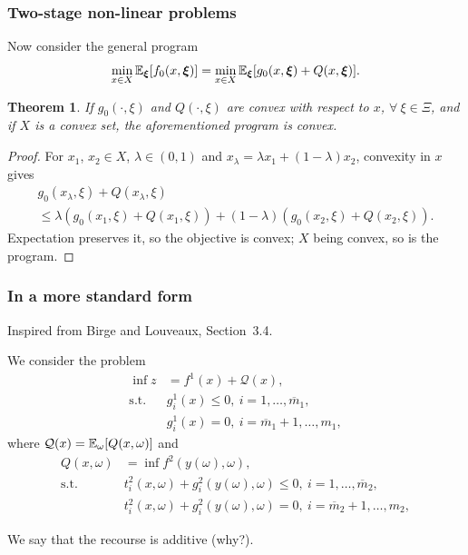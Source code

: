 \documentclass[aspectratio=169]{beamer}
\newtheorem{theo}{Theorem}
\begin{document}
\begin{frame}
\frametitle{Two-stage non-linear problems}
\small

Now consider the general program
\[
\min_{x \in X} {\mathbb{E}}_{{\boldsymbol{\xi}}} [ f_0(x, {\boldsymbol{\xi}}) ] = \min_{x \in X}
{\mathbb{E}}_{{\boldsymbol{\xi}}} [g_0(x,{\boldsymbol{\xi}}) + Q(x, {\boldsymbol{\xi}})].
\]

\begin{theo}
If $g_0(\cdot,\xi)$ and $ Q(\cdot, \xi)$ are convex with respect to $x$, $\forall\ \xi \in \Xi$, and if $X$ is a convex set, the aforementioned program is convex.
\end{theo}
\begin{proof}
For $x_1$, $x_2 \in X$, $\lambda \in (0,1)$ and $x_{\lambda} = \lambda x_1 + (1-\lambda) x_2$, convexity in $x$ gives
\begin{multline*}
g_0(x_{\lambda}, \xi) + Q(x_{\lambda}, \xi) \\
\leq \lambda (g_0(x_1, \xi) + Q(x_1,
\xi)) + (1-\lambda)(g_0(x_2, \xi) + Q(x_2, \xi)).
\end{multline*}
Expectation preserves it, so the objective is convex; $X$ being convex, so is the program.
\end{proof}

\end{frame}

\begin{frame}
\frametitle{In a more standard form}

Inspired from Birge and Louveaux, Section~3.4.

\mbox{}

We consider the problem
\begin{align*}
\inf z &= f^1(x) + \mathcal{Q}(x), \\
\mbox{s.t. } & g_i^1(x) \leq 0,\ i = 1,\ldots,\overline{m}_1, \\
& g_i^1(x) = 0,\ i = \overline{m}_1+1,\ldots,m_1,
\end{align*}
where $\mathcal{Q}(x) = {\mathbb{E}}_{\omega}[Q(x,\omega)]$ and
\begin{align*}
Q(x,\omega) &= \inf f^2(y(\omega), \omega), \\
\mbox{s.t. } & t_i^2(x, \omega) + g_i^2(y(\omega), \omega) \leq 0,\ i
= 1,\ldots,\overline{m}_2,\\
& t_i^2(x, \omega) + g_i^2(y(\omega), \omega) = 0,\ i =
\overline{m}_2+1,\ldots,m_2,
\end{align*}

\mbox{}

We say that the recourse is additive (why?).

\end{frame}
\end{document}
